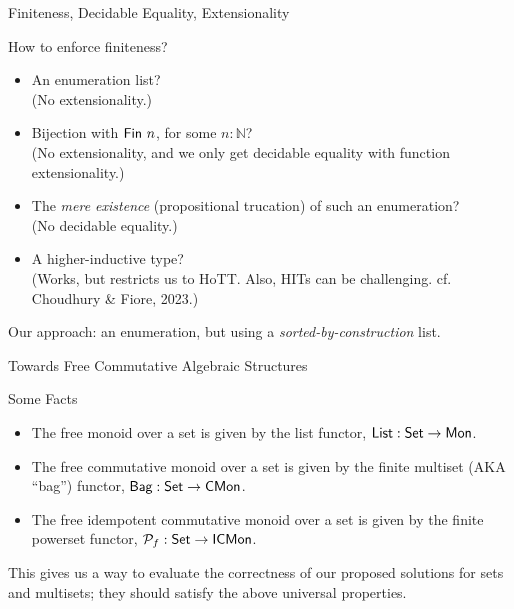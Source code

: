 \documentclass[handout]{beamer}
\begin{document}
\begin{frame}{Finiteness, Decidable Equality, Extensionality}
\begin{block}{How to enforce finiteness?}
\begin{itemize}
  \item An enumeration list? \\
        (No extensionality.)
  \item Bijection with $\AgdaDatatype{Fin}~n$, for some $n : \mathbb{N}$? \\
        (No extensionality, and we only get decidable equality with function extensionality.)
  \item The \emph{mere existence} (propositional trucation) of such an enumeration? \\
        (No decidable equality.)
  \item A higher-inductive type? \\
        (Works, but restricts us to HoTT. Also, HITs can be challenging. cf. Choudhury \& Fiore, 2023.)
\end{itemize}
\end{block}

\begin{center}
Our approach: an enumeration, but using a \emph{sorted-by-construction} list.
\end{center}
\end{frame}


\begin{frame}{Towards Free Commutative Algebraic Structures}
\begin{block}{Some Facts}
\begin{itemize}
\item The free monoid over a set is given by the list functor, $\AgdaDatatype{List} : \AgdaDatatype{Set} \to \AgdaDatatype{Mon}$.
\item The free commutative monoid over a set is given by the finite multiset (AKA ``bag'') functor, $\AgdaDatatype{Bag} : \AgdaDatatype{Set} \to \AgdaDatatype{CMon}$.
\item The free idempotent commutative monoid over a set is given by the finite powerset functor, $\AgdaDatatype{\ensuremath{\mathcal{P}_{f}}} : \AgdaDatatype{Set} \to \AgdaDatatype{ICMon}$.
\end{itemize}
\end{block}

\begin{center}
This gives us a way to evaluate the correctness of our proposed solutions for sets and multisets; they should satisfy the above universal properties.
\end{center}
\end{frame}
\end{document}
